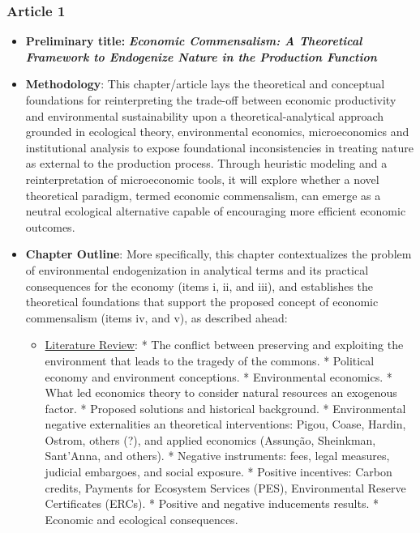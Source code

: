 \subsubsection{Article 1}

\begin{itemize}

    \item \textbf{Preliminary title:} \emph{\textbf{Economic Commensalism: A Theoretical Framework to Endogenize Nature in the Production Function}}
    
    \item \textbf{Methodology}: This chapter/article lays the theoretical and conceptual foundations for reinterpreting the trade-off between economic productivity and environmental sustainability upon a theoretical-analytical approach grounded in ecological theory, environmental economics, microeconomics and institutional analysis to expose foundational inconsistencies in treating nature as external to the production process. Through heuristic modeling and a reinterpretation of microeconomic tools, it will explore whether a novel theoretical paradigm, termed economic commensalism, can emerge as a neutral ecological alternative capable of encouraging more efficient economic outcomes. 
    
    \item \textbf{Chapter Outline}: More specifically, this chapter contextualizes the problem of environmental endogenization in analytical terms and its practical consequences for the economy (items i, ii, and iii), and establishes the theoretical foundations that support the proposed concept of economic commensalism (items iv, and v), as described ahead:
        
        \begin{itemize}
            
            \item[i.] \underline{Literature Review}: * The conflict between preserving and exploiting the environment that leads to the tragedy of the commons. * Political economy and environment conceptions. * Environmental economics. * What led economics theory to consider natural resources an exogenous factor. * Proposed solutions and historical background. * Environmental negative externalities an theoretical interventions: Pigou, Coase, Hardin, Ostrom, others (?), and applied economics (Assunção, Sheinkman, Sant'Anna, and others). * Negative instruments: fees, legal measures, judicial embargoes, and social exposure. * Positive incentives: Carbon credits, Payments for Ecosystem Services (PES), Environmental Reserve Certificates (ERCs). * Positive and negative inducements results. * Economic and ecological consequences.
            

\end{itemize}
\end{itemize}
